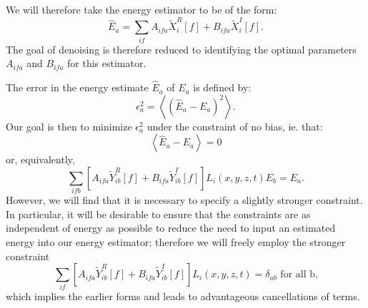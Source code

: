 We will therefore take the energy estimator to be of the form:
\[ \widehat{E}_a = \sum_{if} A_{ifa} \widetilde{X}_i^R[f] + B_{ifa} \widetilde{X}_i^I[f].\]
The goal of denoising is therefore reduced to identifying the optimal parameters $A_{ifa}$ and $B_{ifa}$ for this estimator.

The error in the energy estimate $\widehat{E}_a$ of $E_a$ is defined by:
\[ \epsilon^2_a = \left< \left(\widehat{E}_a - E_a\right)^2\right>. \]
Our goal is then to minimize $\epsilon^2_a$ under the constraint of no bias, ie. that:
\[\left<\widehat{E}_a - E_a\right> = 0\]
or, equivalently,
\[\sum_{ifb}\left[A_{ifa} \widetilde{Y}_{ib}^R[f] + B_{ifa} \widetilde{Y}_{ib}^I[f]\right] L_i(x,y,z,t) E_b = E_a.\]
However, we will find that it is necessary to specify a slightly stronger constraint.  In particular, it will be desirable to ensure that the constraints are as independent of energy as possible to reduce the need to input an estimated energy into our energy estimator; therefore we will freely employ the stronger constraint
\[\sum_{if}\left[A_{ifa} \widetilde{Y}_{ib}^R[f] + B_{ifa} \widetilde{Y}_{ib}^I[f]\right] L_i(x,y,z,t) = \delta_{ab} \text{~for all b,}\]
which implies the earlier forms and leads to advantageous cancellations of terms.

